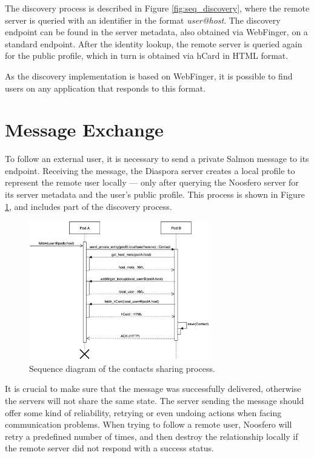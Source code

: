 The discovery process is described in Figure \ref{fig:seq_discovery},
where the remote server is queried with an identifier in the format
\textit{user@host}. The discovery endpoint can be found in the server
metadata, also obtained via WebFinger, on a standard endpoint. After the
identity lookup, the remote server is queried again for the public
profile, which in turn is obtained via hCard in HTML format.

As the discovery implementation is based on WebFinger, it is possible to
find users on any application that responds to this format.

\section{Message Exchange}

To follow an external user, it is necessary to send a private Salmon
message to its endpoint. Receiving the message, the Diaspora server
creates a local profile to represent the remote user locally --- only
after querying the Noosfero server for its server metadata and the
user's public profile. This process is shown in Figure
\ref{fig:seq_contact}, and includes part of the discovery process.

\begin{figure}[h]
	\centering
		\includegraphics[width=0.7\textwidth]{figures/seq_contato.eps}
	\caption{Sequence diagram of the contacts sharing process.}
	\label{fig:seq_contact}
\end{figure}

It is crucial to make sure that the message was successfully delivered,
otherwise the servers will not share the same state. The server sending
the message should offer some kind of reliability, retrying or even
undoing actions when facing communication problems. When trying to
follow a remote user, Noosfero will retry a predefined number of times,
and then destroy the relationship locally if the remote server did not
respond with a success status.


